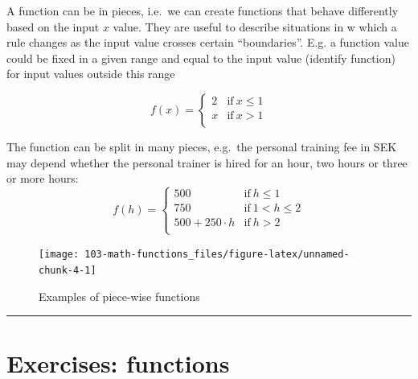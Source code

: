 \documentclass[
]{book}
\theoremstyle{definition}
\theoremstyle{definition}
\theoremstyle{definition}
\theoremstyle{remark}
\begin{document}
A function can be in pieces, i.e.~we can create functions that behave differently based on the input \(x\) value. They are useful to describe situations in w which a rule changes as the input value crosses certain ``boundaries''. E.g. a function value could be fixed in a given range and equal to the input value (identify function) for input values outside this range

\begin{equation}
    f(x) =
    \left\{
        \begin{array}{cc}
                2 & \mathrm{if\ } x \le 1 \\
                x & \mathrm{if\ } x>1 \\
        \end{array}
    \right.
\end{equation}

The function can be split in many pieces, e.g.~the personal training fee in SEK may depend whether the personal trainer is hired for an hour, two hours or three or more hours:
\begin{equation}
    f(h) =
    \left\{
        \begin{array}{cc}
                500  & \mathrm{if\ } h \le 1 \\
                750  & \mathrm{if\ } 1 < h \le 2 \\
                500 + 250 \cdot h & \mathrm{if\ } h > 2 \\
        \end{array}
    \right.
\end{equation}

\begin{figure}

{\centering \texttt{[image: 103-math-functions\_files/figure-latex/unnamed-chunk-4-1]} 

}

\caption{Examples of piece-wise functions}\label{fig:unnamed-chunk-4}
\end{figure}

\begin{center}\rule{0.5\linewidth}{0.5pt}\end{center}

\hypertarget{exercises-functions}{%
\section{Exercises: functions}\label{exercises-functions}}
\end{document}
